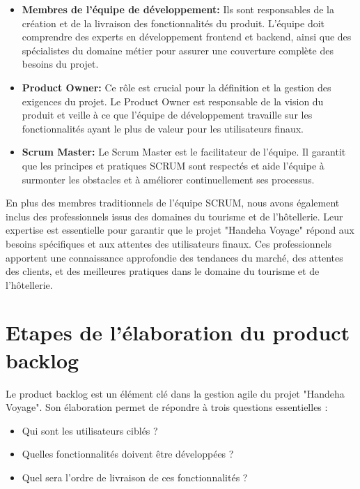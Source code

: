 \documentclass[12pt]{report}
\begin{document}
				\begin{itemize}
					\item \textbf{Membres de l'équipe de développement:} Ils sont responsables de la création et de la livraison des fonctionnalités du produit. L'équipe doit comprendre des experts en développement frontend et backend, ainsi que des spécialistes du domaine métier pour assurer une couverture complète des besoins du projet.
					\item \textbf{Product Owner:} Ce rôle est crucial pour la définition et la gestion des exigences du projet. Le Product Owner est responsable de la vision du produit et veille à ce que l'équipe de développement travaille sur les fonctionnalités ayant le plus de valeur pour les utilisateurs finaux.
					\item \textbf{Scrum Master:} Le Scrum Master est le facilitateur de l'équipe. Il garantit que les principes et pratiques SCRUM sont respectés et aide l'équipe à surmonter les obstacles et à améliorer continuellement ses processus.
				\end{itemize}
				
				En plus des membres traditionnels de l'équipe SCRUM, nous avons également inclus des professionnels issus des domaines du tourisme et de l'hôtellerie. Leur expertise est essentielle pour garantir que le projet "Handeha Voyage" répond aux besoins spécifiques et aux attentes des utilisateurs finaux. Ces professionnels apportent une connaissance approfondie des tendances du marché, des attentes des clients, et des meilleures pratiques dans le domaine du tourisme et de l'hôtellerie.

				\section{Etapes de l’élaboration du product backlog}

				\hspace{15pt} Le product backlog est un élément clé dans la gestion agile du projet "Handeha Voyage". Son élaboration permet de répondre à trois questions essentielles :

				\begin{itemize}
					\item Qui sont les utilisateurs ciblés ?
					\item Quelles fonctionnalités doivent être développées ?
					\item Quel sera l'ordre de livraison de ces fonctionnalités ?
				\end{itemize}
\end{document}
